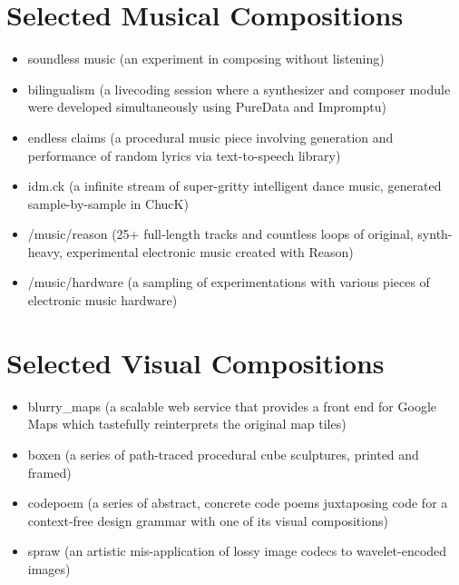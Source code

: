 \documentclass[12pt]{article}
\begin{document}
\section*{Selected Musical Compositions}
\begin{itemize}
  \item soundless music (an experiment in composing without listening)
  \item bilingualism (a livecoding session where a synthesizer and composer module were developed simultaneously using PureData and Impromptu)
  \item endless claims (a procedural music piece involving generation and performance of random lyrics via text-to-speech library)
  \item idm.ck (a infinite stream of super-gritty intelligent dance music, generated sample-by-sample in ChucK) 
  \item /music/reason (25+ full-length tracks and countless loops of original, synth-heavy, experimental electronic music created with Reason) 
  \item /music/hardware (a sampling of experimentations with various pieces of electronic music hardware)
\end{itemize}

\section*{Selected Visual Compositions}
\begin{itemize}
  \item blurry\_maps (a scalable web service that provides a front end for Google Maps which tastefully reinterprets the original map tiles)
  \item boxen (a series of path-traced procedural cube sculptures, printed and framed)
  \item codepoem (a series of abstract, concrete code poems juxtaposing code for a context-free design grammar with one of its visual compositions)
  \item spraw (an artistic mis-application of lossy image codecs to wavelet-encoded images)
\end{itemize}
\end{document}
